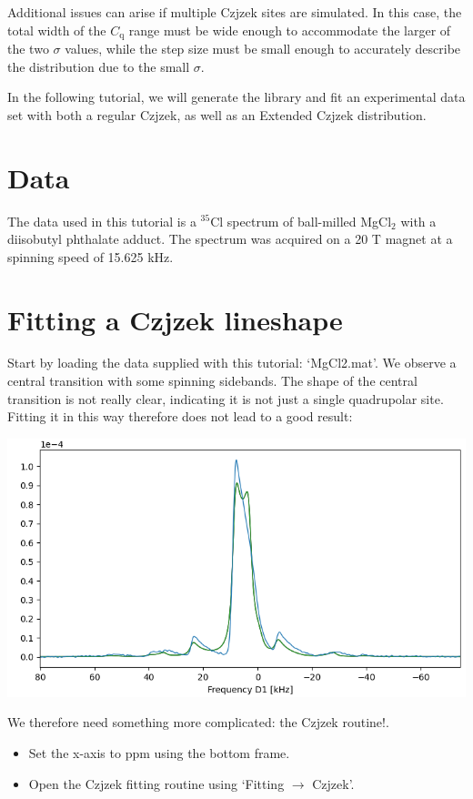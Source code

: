 \documentclass[11pt,a4paper]{article}
\begin{document}
Additional issues can arise if multiple Czjzek sites are simulated. In this case, the total width of the 
$C_\text{q}$ range must be wide enough to accommodate the larger of the two $\sigma$ values, while the step size must be small enough to accurately describe the distribution due to the small $\sigma$.

In the following tutorial, we will generate the library and fit an experimental data set with both a regular Czjzek, as well as an Extended Czjzek distribution.


\section{Data}
The data used in this tutorial is a $^{35}$Cl spectrum of ball-milled MgCl$_2$ with a diisobutyl phthalate adduct. The spectrum was acquired on a 20 T magnet at a spinning speed of 15.625 kHz.


\section{Fitting a Czjzek lineshape}
Start by loading the data supplied with this tutorial: `MgCl2.mat'. We observe a central transition with some spinning sidebands. The shape of the central transition is not really clear, indicating it is not just a single quadrupolar site. Fitting it in this way therefore does not lead to a good result:

\begin{center}
\includegraphics[width=0.8\linewidth]{Figs/fig1.PNG}
\end{center}

We therefore need something more complicated: the Czjzek routine!.
\begin{itemize}
  \item Set the x-axis to ppm using the bottom frame. 
  \item Open the Czjzek fitting routine using `Fitting $\longrightarrow$ Czjzek'.
\end{itemize}
\end{document}
